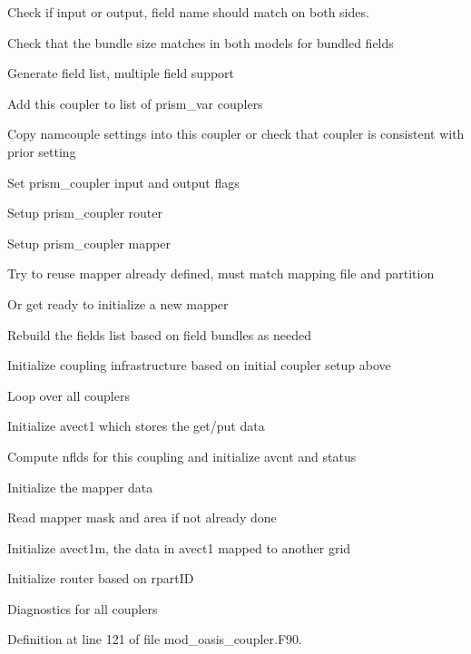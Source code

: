 \begin{DoxyItemize}
\begin{DoxyItemize}
\begin{DoxyItemize}
\begin{DoxyItemize}
\item Check if input or output, field name should match on both sides.
\item Check that the bundle size matches in both models for bundled fields
\item Generate field list, multiple field support
\item Add this coupler to list of prism\+\_\+var couplers
\item Copy namcouple settings into this coupler or check that coupler is consistent with prior setting
\item Set prism\+\_\+coupler input and output flags
\item Setup prism\+\_\+coupler router
\item Setup prism\+\_\+coupler mapper
\item Try to reuse mapper already defined, must match mapping file and partition
\item Or get ready to initialize a new mapper
\end{DoxyItemize}
\end{DoxyItemize}
\end{DoxyItemize}
\item Rebuild the fields list based on field bundles as needed
\item Initialize coupling infrastructure based on initial coupler setup above
\item Loop over all couplers
\begin{DoxyItemize}
\item Initialize avect1 which stores the get/put data
\item Compute nflds for this coupling and initialize avcnt and status
\item Initialize the mapper data
\item Read mapper mask and area if not already done
\item Initialize avect1m, the data in avect1 mapped to another grid
\item Initialize router based on rpart\+ID
\end{DoxyItemize}
\item Diagnostics for all couplers 
\end{DoxyItemize}

Definition at line 121 of file mod\+\_\+oasis\+\_\+coupler.\+F90.

\mbox{\label{namespacemod__oasis__coupler_ad8c9a74a349ea4420ac38e2da2dc3cd2}} 
